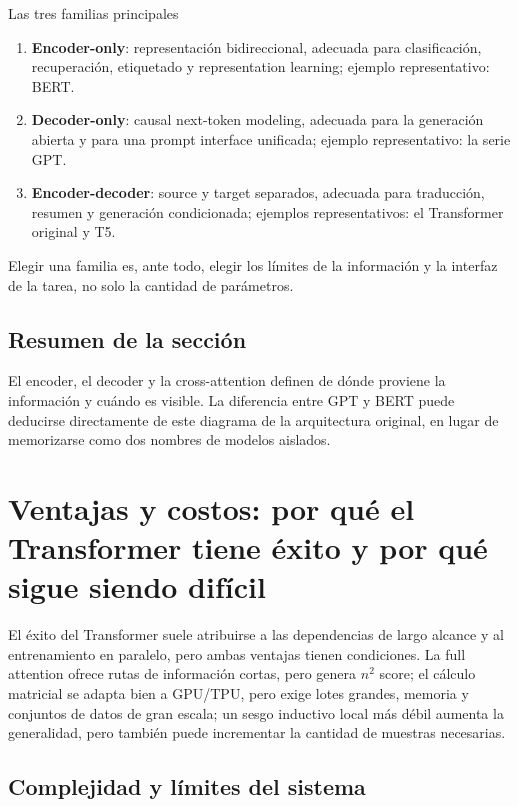 \documentclass[a4paper]{article}
\begin{document}
\begin{importantbox}{Las tres familias principales}
\begin{enumerate}
  \item \textbf{Encoder-only}: representación bidireccional, adecuada para clasificación, recuperación, etiquetado y representation learning; ejemplo representativo: BERT.
  \item \textbf{Decoder-only}: causal next-token modeling, adecuada para la generación abierta y para una prompt interface unificada; ejemplo representativo: la serie GPT.
  \item \textbf{Encoder-decoder}: source y target separados, adecuada para traducción, resumen y generación condicionada; ejemplos representativos: el Transformer original y T5.
\end{enumerate}
Elegir una familia es, ante todo, elegir los límites de la información y la interfaz de la tarea, no solo la cantidad de parámetros.
\end{importantbox}

\subsection{Resumen de la sección}

El encoder, el decoder y la cross-attention definen de dónde proviene la información y cuándo es visible. La diferencia entre GPT y BERT puede deducirse directamente de este diagrama de la arquitectura original, en lugar de memorizarse como dos nombres de modelos aislados.
\section{Ventajas y costos: por qué el Transformer tiene éxito y por qué sigue siendo difícil}

El éxito del Transformer suele atribuirse a las dependencias de largo alcance y al entrenamiento en paralelo, pero ambas ventajas tienen condiciones. La full attention ofrece rutas de información cortas, pero genera $n^2$ score; el cálculo matricial se adapta bien a GPU/TPU, pero exige lotes grandes, memoria y conjuntos de datos de gran escala; un sesgo inductivo local más débil aumenta la generalidad, pero también puede incrementar la cantidad de muestras necesarias.

\subsection{Complejidad y límites del sistema}
\end{document}
